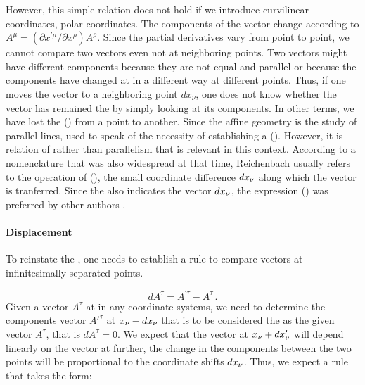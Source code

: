\documentclass[submitted]{article}
\renewcommand{\diff}{d}
\begin{document}
However, this simple relation does not hold if we introduce curvilinear coordinates, \eg polar coordinates. The components of the vector change according to $A^{\mu}=\left(\partial x^{\prime \mu} / \partial x^{\rho}\right) A^{\rho}$. Since the partial derivatives vary from point to point, we cannot compare two vectors even not at neighboring points. Two vectors might have different components because they are not equal and parallel or because the components have changed at in a different way at different points. Thus, if one moves the vector to a neighboring point $dx_\nu$, one does not know whether the vector has remained the  by simply looking at its components. In other terms, we have lost the  () from a point to another. Since the affine geometry is the study of parallel lines, \citet{Weyl1918a,Weyl1918b} used to speak of the necessity of establishing a  (). However, it is relation of  rather than parallelism that is relevant in this context. According to a nomenclature that was also widespread at that time, Reichenbach usually refers to the operation of  (), the small coordinate difference $dx_{\nu}$ along which the vector is tranferred. Since the  also indicates the vector $dx_{\nu}$, the expression  () was preferred by other authors .

\paragraph{Displacement}
%
To reinstate the , one needs to establish a rule to compare vectors at infinitesimally separated points. 

\begin{equation*}
dA^\tau = A^{\prime\tau}-A^{\tau}\,.
\end{equation*}
%
Given a vector $A^\tau$ at \xn in any coordinate systems, we need to determine the components vector $A'^\tau$ at $x_{\nu}+dx_{\nu}$ that is to be considered the  as the given vector $A^\tau$, that is $dA^\tau=0$. We expect that the vector at $\xn+\diff \xnpr$ will depend linearly on the vector at \xn further, the change in the components between the two points will be proportional to the coordinate shifts $\diff \xn$. Thus, we expect a rule that takes the form:
\end{document}
